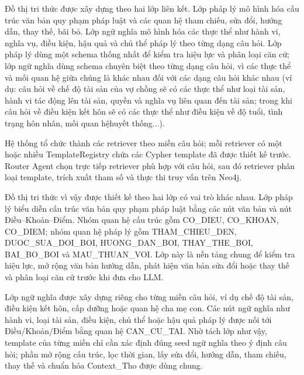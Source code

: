 \documentclass[../DoAn.tex]{subfiles}
\begin{document}
Đồ thị tri thức được xây dựng theo hai lớp liên kết. Lớp pháp lý mô hình hóa cấu trúc văn bản quy phạm pháp luật và các quan hệ tham chiếu, sửa đổi, hướng dẫn, thay thế, bãi bỏ. Lớp ngữ nghĩa mô hình hóa các thực thể như hành vi, nghĩa vụ, điều kiện, hậu quả và chủ thể pháp lý theo từng dạng câu hỏi. Lớp pháp lý dùng một schema thống nhất để kiểm tra hiệu lực và phân loại căn cứ; lớp ngữ nghĩa dùng schema chuyên biệt theo từng dạng câu hỏi, vì các thực thể và mối quan hệ giữa chúng là khác nhau đối với các dạng câu hỏi khác nhau (ví dụ: câu hỏi về chế độ tài sản của vợ chồng sẽ có các thực thể như loại tài sản, hành vi tác động lên tài sản, quyền và nghĩa vụ liên quan đến tài sản; trong khi câu hỏi về điều kiện kết hôn sẽ có các thực thể như điều kiện về độ tuổi, tình trạng hôn nhân, mối quan hệhuyết thống...).

Hệ thống tổ chức thành các retriever theo miền câu hỏi; mỗi retriever có một hoặc nhiều TemplateRegistry chứa các Cypher template đã được thiết kế trước. Router Agent chọn trực tiếp retriever phù hợp với câu hỏi, sau đó retriever phân loại template, trích xuất tham số và thực thi truy vấn trên Neo4j.

Đồ thị tri thức vì vậy được thiết kế theo hai lớp có vai trò khác nhau. Lớp pháp lý biểu diễn cấu trúc văn bản quy phạm pháp luật bằng các nút văn bản và nút Điều--Khoản--Điểm. Nhóm quan hệ cấu trúc gồm CO\_\allowbreak DIEU, CO\_\allowbreak KHOAN, CO\_\allowbreak DIEM; nhóm quan hệ pháp lý gồm THAM\_\allowbreak CHIEU\_\allowbreak DEN, DUOC\_\allowbreak SUA\_\allowbreak DOI\_\allowbreak BOI, HUONG\_\allowbreak DAN\_\allowbreak BOI, THAY\_\allowbreak THE\_\allowbreak BOI, BAI\_\allowbreak BO\_\allowbreak BOI và MAU\_\allowbreak THUAN\_\allowbreak VOI. Lớp này là nền tảng chung để kiểm tra hiệu lực, mở rộng văn bản hướng dẫn, phát hiện văn bản sửa đổi hoặc thay thế và phân loại căn cứ trước khi đưa cho LLM.

Lớp ngữ nghĩa được xây dựng riêng cho từng miền câu hỏi, ví dụ chế độ tài sản, điều kiện kết hôn, cấp dưỡng hoặc quan hệ cha mẹ con. Các nút ngữ nghĩa như hành vi, loại tài sản, điều kiện, chủ thể hoặc hậu quả pháp lý được nối tới Điều/Khoản/Điểm bằng quan hệ CAN\_CU\_TAI. Nhờ tách lớp như vậy, template của từng miền chỉ cần xác định đúng seed ngữ nghĩa theo ý định câu hỏi; phần mở rộng cấu trúc, lọc thời gian, lấy sửa đổi, hướng dẫn, tham chiếu, thay thế và chuẩn hóa Context\_Tho được dùng chung.
\end{document}
